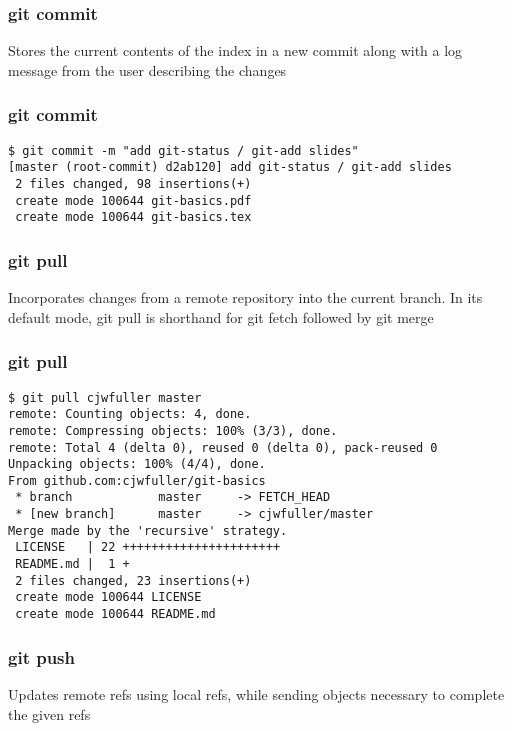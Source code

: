 \documentclass{beamer}
\begin{document}

\begin{frame}
\frametitle{git commit}
Stores the current contents of the index in a new commit along with a log message from the user describing the changes
\end{frame}


\begin{frame}[fragile]
\frametitle{git commit}
	\scriptsize
	\begin{verbatim}
$ git commit -m "add git-status / git-add slides"
[master (root-commit) d2ab120] add git-status / git-add slides
 2 files changed, 98 insertions(+)
 create mode 100644 git-basics.pdf
 create mode 100644 git-basics.tex
	\end{verbatim}
\end{frame}


\begin{frame}
\frametitle{git pull}
Incorporates changes from a remote repository into the current branch. In its default mode, git pull is shorthand for git fetch followed by git merge
\end{frame}


\begin{frame}[fragile]
\frametitle{git pull}
	\scriptsize
	\begin{verbatim}
$ git pull cjwfuller master
remote: Counting objects: 4, done.
remote: Compressing objects: 100% (3/3), done.
remote: Total 4 (delta 0), reused 0 (delta 0), pack-reused 0
Unpacking objects: 100% (4/4), done.
From github.com:cjwfuller/git-basics
 * branch            master     -> FETCH_HEAD
 * [new branch]      master     -> cjwfuller/master
Merge made by the 'recursive' strategy.
 LICENSE   | 22 ++++++++++++++++++++++
 README.md |  1 +
 2 files changed, 23 insertions(+)
 create mode 100644 LICENSE
 create mode 100644 README.md
	\end{verbatim}
\end{frame}


\begin{frame}
\frametitle{git push}
Updates remote refs using local refs, while sending objects necessary to complete the given refs
\end{frame}
\end{document}
